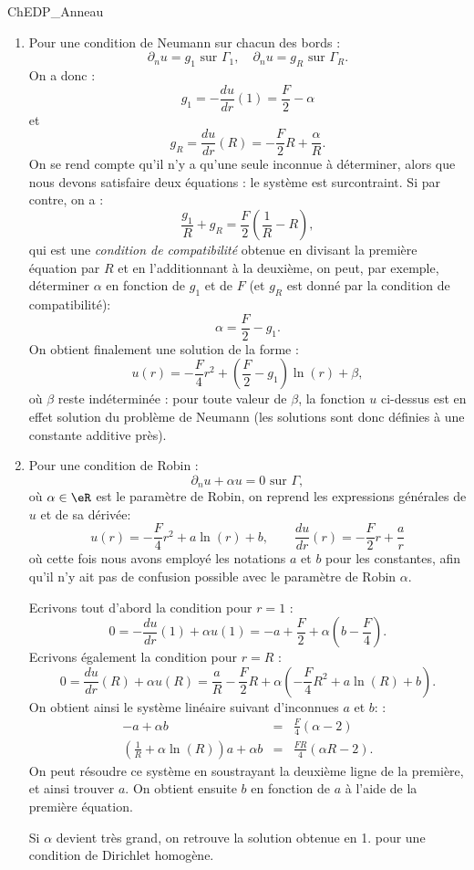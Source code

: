 \begin{corrige}{ChEDP_Anneau}
\begin{enumerate}
\item Pour une condition de Neumann sur chacun des bords :
\[
\partial_n u = g_1 \mbox{ sur } \Gamma_1,
\quad \partial_n u = g_R \mbox{ sur } \Gamma_R.
\]
On a donc :
\[
g_1 = - \frac{du}{dr} (1) = \frac{F}{2} - {\alpha}
\]
et 
\[
g_R = \frac{du}{dr} (R) = -\frac{F}{2} R + \frac{\alpha}{R}.
\]
On se rend compte qu'il n'y a qu'une seule inconnue à déterminer, alors que nous devons satisfaire deux équations : le système est surcontraint. Si par contre, on a :
\[
\frac{g_1}{R} + g_R = \frac{F}{2} \left ( \frac{1}{R} - R \right ),
\]
qui est une \emph{condition de compatibilité} obtenue en divisant la première équation par $R$ et en l'additionnant à la deuxième, on peut, par exemple, déterminer $\alpha$ en fonction de $g_1$ et de $F$ (et $g_R$ est donné par la condition de compatibilité):
\[
\alpha = \frac{F}{2} - g_1.
\]
On obtient finalement une solution de la forme :
\[
u(r) = -\frac{F}{4} r^2 + \left ( \frac{F}{2} - g_1 \right )  \ln (r) + \beta,
\]
où $\beta$ reste indéterminée : pour toute valeur de $\beta$, la fonction $u$ ci-dessus est en effet solution du problème de Neumann (les solutions sont donc définies à une constante additive près).

\item Pour une condition de Robin :
\[
\partial_n u + \alpha u = 0 \mbox{ sur } \Gamma,
\]
où $\alpha \in \eR$ est le paramètre de Robin, on reprend les expressions générales de $u$ et de sa dérivée:
\[
u(r) = -\frac{F}{4} r^2 + a \ln (r) + b,
\qquad
\frac{du}{dr}(r) = -\frac{F}{2} r + \frac{a}{r}
\]
où cette fois nous avons employé les notations $a$ et $b$ pour les constantes, afin qu'il n'y ait pas de confusion possible avec le paramètre de Robin $\alpha$.

Ecrivons tout d'abord la condition pour $r=1$ :
\[
0 = -\frac{du}{dr} (1) + \alpha u(1)
= -a + \frac{F}{2} + \alpha ( b - \frac{F}{4} ).
\]
Ecrivons également la condition pour $r=R$ :
\[
0 = \frac{du}{dr} (R) + \alpha u(R)
= \frac{a}{R} - \frac{F}{2} R + \alpha ( -\frac{F}{4} R^2 + a \ln(R) + b ).
\]
On obtient ainsi le système linéaire suivant d'inconnues $a$ et $b$:
 :
\begin{eqnarray*}
- a + \alpha b &=& \frac{F}{4} ( \alpha - 2)\\
(\frac{1}{R} + \alpha \ln(R) ) a + \alpha b &=& \frac{FR}{4} (\alpha R - 2).
\end{eqnarray*}
On peut résoudre ce système en soustrayant la deuxième ligne de la première, et ainsi trouver $a$. On obtient ensuite $b$ en fonction de $a$ à l'aide de la première équation.

Si $\alpha$ devient très grand, on retrouve la solution obtenue en 1. pour une condition de Dirichlet homogène.

\end{enumerate}

\end{corrige}

